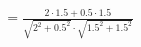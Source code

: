 \documentclass[preview]{standalone}
\begin{document}
\begin{align*}
&= \frac{2 \cdot 1.5 + 0.5 \cdot 1.5}{\sqrt{2^2 + 0.5^2} \cdot \sqrt{1.5^2 + 1.5^2}}\\
\end{align*}
\end{document}
